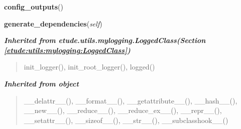     \label{etude:experiments:experiment:Experiment:config_outputs}

    \vspace{0.5ex}

\hspace{.8\funcindent}\begin{boxedminipage}{\funcwidth}

    \raggedright \textbf{config\_outputs}()

\setlength{\parskip}{2ex}
\setlength{\parskip}{1ex}
    \end{boxedminipage}

    \label{etude:experiments:experiment:Experiment:generate_dependencies}

    \vspace{0.5ex}

\hspace{.8\funcindent}\begin{boxedminipage}{\funcwidth}

    \raggedright \textbf{generate\_dependencies}(\textit{self})

\setlength{\parskip}{2ex}
\setlength{\parskip}{1ex}
    \end{boxedminipage}


\large{\textbf{\textit{Inherited from etude.utils.mylogging.LoggedClass\textit{(Section \ref{etude:utils:mylogging:LoggedClass})}}}}

\begin{quote}
init\_logger(), init\_root\_logger(), logged()
\end{quote}

\large{\textbf{\textit{Inherited from object}}}

\begin{quote}
\_\_delattr\_\_(), \_\_format\_\_(), \_\_getattribute\_\_(), \_\_hash\_\_(), \_\_new\_\_(), \_\_reduce\_\_(), \_\_reduce\_ex\_\_(), \_\_repr\_\_(), \_\_setattr\_\_(), \_\_sizeof\_\_(), \_\_str\_\_(), \_\_subclasshook\_\_()
\end{quote}

